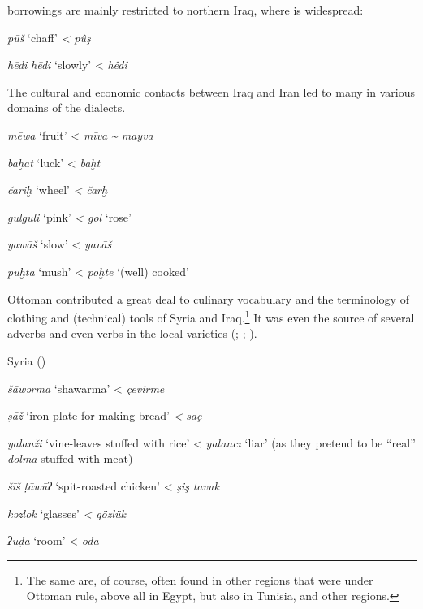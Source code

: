 \documentclass[output=paper]{langsci/langscibook}
\begin{document}
 borrowings are mainly restricted to northern Iraq, where  is widespread: 
\ea
{}

\textit{pūš} ‘chaff’ \textit{<}  \textit{pûş}

\textit{hēdi} \textit{hēdi} ‘slowly’ <  \textit{hêdî} \citep[68]{Jastrow1979}
\z

The  cultural and economic contacts between Iraq and Iran led to many   in various domains of the  dialects. 

\ea
\textit{mēwa} ‘fruit’ <  \textit{mīva} \textit{{\textasciitilde} mayva}

\textit{baḫat} ‘luck’ <  \textit{baḫt}

\textit{čariḫ} ‘wheel’ \textit{<}  \textit{čarḫ} 

\textit{gulguli} ‘pink’ \textit{<}  \textit{gol} ‘rose’

\textit{yawāš} ‘slow’ <  \textit{yavāš}

\textit{puḫta} ‘mush’ <  \textit{poḫte} ‘(well) cooked’
\z

Ottoman  contributed a great deal to culinary vocabulary and the terminology of clothing and (technical) tools of Syria and Iraq.\footnote{The same  are, of course, often found in other regions that were under Ottoman rule, above all in Egypt, but also in Tunisia,  and other regions.} It was even the source of several adverbs and even verbs in the local  varieties (\citealt{Halasi-Kun1969}; \citeyear{Halasi-Kun1973}; \citeyear{Halasi-Kun1982}).

\ea
Syria ()

\textit{šāwərma} ‘shawarma’ <  \textit{çevirme} 

\textit{ṣāž} ‘iron plate for making bread’ \textit{<}  \textit{saç}

\textit{yalanži} ‘vine-leaves stuffed with rice’ <  \textit{yalancı} ‘liar’ (as they pretend to be “real” \textit{dolma} stuffed with meat)

\textit{šīš} \textit{ṭāwūʔ} ‘spit-roasted chicken’ <  \textit{şiş} \textit{tavuk}

\textit{kǝzlok} ‘glasses’ \textit{<}  \textit{gözlük}

\textit{ʔūḍa} ‘room’ <  \textit{oda}
\end{document}
